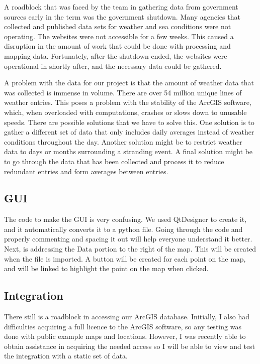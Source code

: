 \documentclass[onecolumn, draftclsnofoot,10pt, compsoc]{IEEEtran}
\begin{document}
\par A roadblock that was faced by the team in gathering data from government sources early in the term was the government shutdown.  Many agencies that collected and published data sets for weather and sea conditions were not operating. The websites were not accessible for a few weeks.  This caused a disruption in the amount of work that could be done with processing and mapping data.  Fortunately, after the shutdown ended, the websites were operational in shortly after, and the necessary data could be gathered.\newline

A problem with the data for our project is that the amount of weather data that was collected is immense in volume.  There are over 54 million unique lines of weather entries.  This poses a problem with the stability of the ArcGIS software, which, when overloaded with computations, crashes or slows down to unusable speeds.  There are possible solutions that we have to solve this. One solution is to gather a different set of data that only includes daily averages instead of weather conditions throughout the day.  Another solution might be to restrict weather data to days or months surrounding a stranding event.  A final solution might be to go through the data that has been collected and process it to reduce redundant entries and form averages between entries.

\subsection{GUI}
The code to make the GUI is very confusing. We used QtDesigner to create it, and it automatically converts it to a python file. Going through the code and properly commenting and spacing it out will help everyone understand it better. Next, is addressing the Data portion to the right of the map. This will be created when the file is imported. A button will be created for each point on the map, and will be linked to highlight the point on the map when clicked.
\subsection{Integration}
There still is a roadblock in accessing our ArcGIS database. Initially, I also had difficulties acquiring a full licence to the ArcGIS software, so any testing was done with public example maps and locations. However, I was recently able to obtain assistance in acquiring the needed access so I will be able to view and test the integration with a static set of data.
\end{document}
